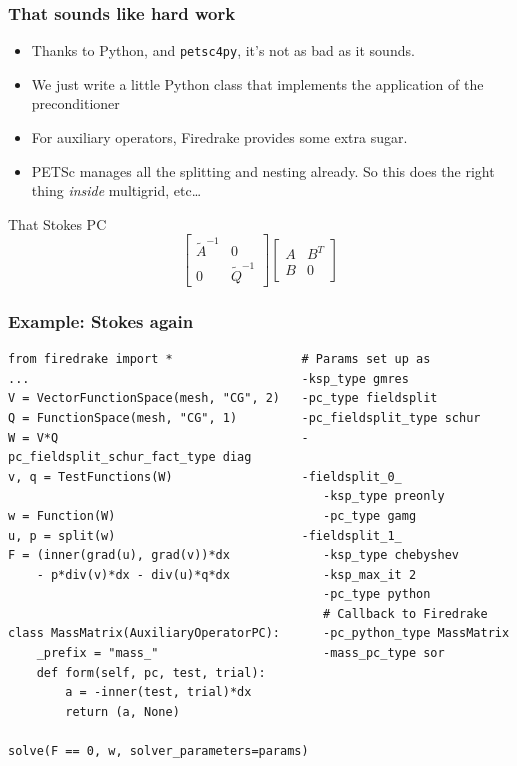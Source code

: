 \documentclass[presentation,aspectratio=43, 10pt]{beamer}
\begin{document}
\begin{frame}[fragile]
  \frametitle{That sounds like hard work}

  \begin{itemize}
  \item Thanks to Python, and \texttt{petsc4py}, it's not as bad as
    it sounds.
  \item We just write a little Python class that implements the
    application of the preconditioner
  \item For auxiliary operators, Firedrake provides some extra
    sugar.
  \item PETSc manages all the splitting and nesting already. So this
    does the right thing \emph{inside} multigrid, etc\ldots
  \end{itemize}
  \begin{block}{That Stokes PC}
    \begin{equation*}
      \begin{bmatrix}
        \tilde{A}^{-1} & 0 \\
        0 & \tilde{Q}^{-1}
      \end{bmatrix}
      \begin{bmatrix}
        A & B^T \\
        B & 0
      \end{bmatrix}
    \end{equation*}
  \end{block}
\end{frame}

\begin{frame}[fragile]
  \frametitle{Example: Stokes again}
\begin{verbatim}
from firedrake import *                  # Params set up as
...                                      -ksp_type gmres
V = VectorFunctionSpace(mesh, "CG", 2)   -pc_type fieldsplit
Q = FunctionSpace(mesh, "CG", 1)         -pc_fieldsplit_type schur
W = V*Q                                  -pc_fieldsplit_schur_fact_type diag
v, q = TestFunctions(W)                  -fieldsplit_0_
                                            -ksp_type preonly
w = Function(W)                             -pc_type gamg
u, p = split(w)                          -fieldsplit_1_
F = (inner(grad(u), grad(v))*dx             -ksp_type chebyshev
    - p*div(v)*dx - div(u)*q*dx             -ksp_max_it 2
                                            -pc_type python
                                            # Callback to Firedrake
class MassMatrix(AuxiliaryOperatorPC):      -pc_python_type MassMatrix
    _prefix = "mass_"                       -mass_pc_type sor
    def form(self, pc, test, trial):
        a = -inner(test, trial)*dx
        return (a, None)

solve(F == 0, w, solver_parameters=params)
\end{verbatim}
\end{frame}
\end{document}
